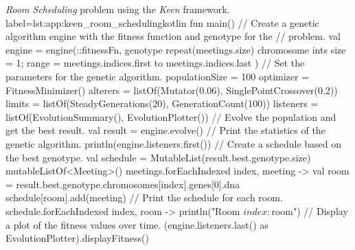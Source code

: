 \begin{code}{
    \textit{Room Scheduling} problem using the \textit{Keen} framework.
  }{label=lst:app:keen_room_scheduling}{kotlin}
    fun main() {
        // Create a genetic algorithm engine with the fitness function and genotype for the 
        // problem.
        val engine = engine(::fitnessFn, genotype {
            repeat(meetings.size) {
                chromosome {
                    ints { size = 1; range = meetings.indices.first to meetings.indices.last }
                }
            }
        }) {
            // Set the parameters for the genetic algorithm.
            populationSize = 100
            optimizer = FitnessMinimizer()
            alterers = listOf(Mutator(0.06), SinglePointCrossover(0.2))
            limits = listOf(SteadyGenerations(20), GenerationCount(100))
            listeners = listOf(EvolutionSummary(), EvolutionPlotter())
        }
        // Evolve the population and get the best result.
        val result = engine.evolve()
        // Print the statistics of the genetic algorithm.
        println(engine.listeners.first())
        // Create a schedule based on the best genotype.
        val schedule = MutableList(result.best.genotype.size) { mutableListOf<Meeting>() }
        meetings.forEachIndexed { index, meeting ->
            val room = result.best.genotype.chromosomes[index].genes[0].dna
            schedule[room].add(meeting)
        }
        // Print the schedule for each room.
        schedule.forEachIndexed { index, room ->
            println("Room $index: $room")
        }
        // Display a plot of the fitness values over time.
        (engine.listeners.last() as EvolutionPlotter).displayFitness()
    }
  \end{code}